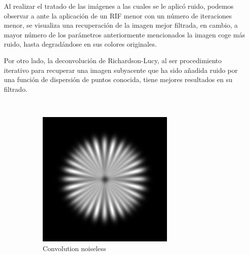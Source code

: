 \documentclass{./packages/optica-article}
\begin{document}
Al realizar el tratado de las imágenes a las cuales se le aplicó ruido, podemos observar a ante la aplicación de un RIF menor con un número de iteraciones menor, se visualiza una recuperación de la imagen mejor filtrada, en cambio, a mayor número de los parámetros anteriormente mencionados la imagen coge más ruido, hasta degradándose en sus colores originales.

Por otro lado, la deconvolución de Richardson-Lucy, al ser procedimiento iterativo para recuperar una imagen subyacente que ha sido añadida ruido por una función de dispersión de puntos conocida, tiene mejores resultados en su filtrado.

\begin{figure}[hbp]
	\begin{center}
		\,\hfill
		\begin{subfigure}[t]{0.25\textwidth}\centering
			\centering
			\includegraphics[width=\textwidth]{Simulation deconvolution/ref_conv}
			\caption{Convolution noiseless}\label{fig:sim:conv}
		\end{subfigure}
		\,\hfill
		\begin{subfigure}[t]{0.25\textwidth}\centering
			\centering

\end{subfigure}
\end{center}
\end{figure}
\end{document}
